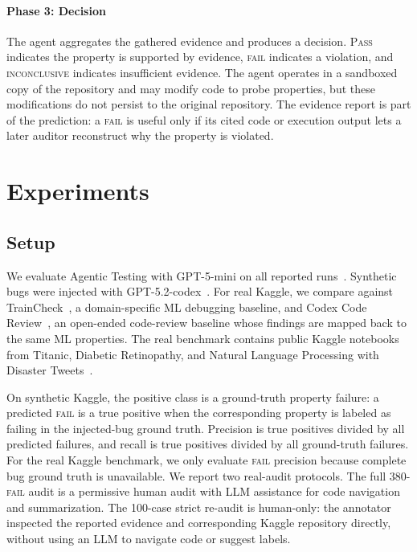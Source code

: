 \documentclass[11pt]{article}
\begin{document}
\paragraph{Phase 3: Decision}
The agent aggregates the gathered evidence and produces a decision.
\textsc{Pass} indicates the property is supported by evidence, \textsc{fail} indicates a violation, and \textsc{inconclusive} indicates insufficient evidence.
The agent operates in a sandboxed copy of the repository and may modify code to probe properties, but these modifications do not persist to the original repository.
The evidence report is part of the prediction: a \textsc{fail} is useful only if its cited code or execution output lets a later auditor reconstruct why the property is violated.

\section{Experiments}

\subsection{Setup}

We evaluate Agentic Testing with GPT-5-mini on all reported runs~\citep{openai_models}.
Synthetic bugs were injected with GPT-5.2-codex~\citep{openai_models}.
For real Kaggle, we compare against TrainCheck~\citep{traincheck}, a domain-specific ML debugging baseline, and Codex Code Review~\citep{openai_codex}, an open-ended code-review baseline whose findings are mapped back to the same ML properties.
The real benchmark contains public Kaggle notebooks from Titanic, Diabetic Retinopathy, and Natural Language Processing with Disaster Tweets~\citep{kaggle_titanic,kaggle_diabetic_retinopathy,kaggle_disaster_tweets}.

On synthetic Kaggle, the positive class is a ground-truth property failure: a predicted \textsc{fail} is a true positive when the corresponding property is labeled as failing in the injected-bug ground truth.
Precision is true positives divided by all predicted failures, and recall is true positives divided by all ground-truth failures.
For the real Kaggle benchmark, we only evaluate \textsc{fail} precision because complete bug ground truth is unavailable.
We report two real-audit protocols.
The full 380-\textsc{fail} audit is a permissive human audit with LLM assistance for code navigation and summarization.
The 100-case strict re-audit is human-only: the annotator inspected the reported evidence and corresponding Kaggle repository directly, without using an LLM to navigate code or suggest labels.
\end{document}

